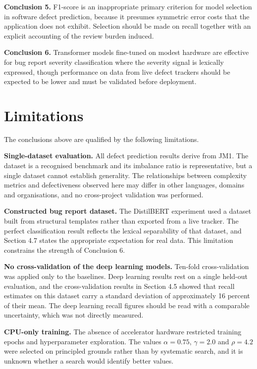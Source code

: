 \documentclass[12pt,a4paper,oneside]{report}
\begin{document}
\textbf{Conclusion 5.} F1-score is an inappropriate primary criterion for model selection in software defect prediction, because it presumes symmetric error costs that the application does not exhibit. Selection should be made on recall together with an explicit accounting of the review burden induced.

\textbf{Conclusion 6.} Transformer models fine-tuned on modest hardware are effective for bug report severity classification where the severity signal is lexically expressed, though performance on data from live defect trackers should be expected to be lower and must be validated before deployment.

\section{Limitations}

The conclusions above are qualified by the following limitations.

\textbf{Single-dataset evaluation.} All defect prediction results derive from JM1. The dataset is a recognised benchmark and its imbalance ratio is representative, but a single dataset cannot establish generality. The relationships between complexity metrics and defectiveness observed here may differ in other languages, domains and organisations, and no cross-project validation was performed.

\textbf{Constructed bug report dataset.} The DistilBERT experiment used a dataset built from structural templates rather than exported from a live tracker. The perfect classification result reflects the lexical separability of that dataset, and Section 4.7 states the appropriate expectation for real data. This limitation constrains the strength of Conclusion 6.

\textbf{No cross-validation of the deep learning models.} Ten-fold cross-validation was applied only to the baselines. Deep learning results rest on a single held-out evaluation, and the cross-validation results in Section 4.5 showed that recall estimates on this dataset carry a standard deviation of approximately 16 percent of their mean. The deep learning recall figures should be read with a comparable uncertainty, which was not directly measured.

\textbf{CPU-only training.} The absence of accelerator hardware restricted training epochs and hyperparameter exploration. The values $\alpha = 0.75$, $\gamma = 2.0$ and $\rho = 4.2$ were selected on principled grounds rather than by systematic search, and it is unknown whether a search would identify better values.
\end{document}
